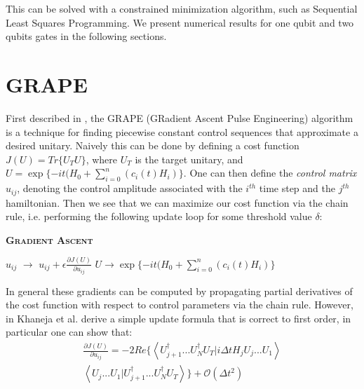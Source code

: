 \documentclass[aps,nofootinbib,pra,notitlepage,twocolumn]{revtex4-1}
\newcommand{\braket}[2]{\left\langle #1 | #2 \right\rangle}
\begin{document}
This can be solved with a constrained minimization algorithm, such as Sequential Least Squares Programming. We present numerical results for one qubit and two qubits gates in the following sections.

\section{GRAPE}
First described in \cite{Khaneja2005}, the GRAPE (GRadient Ascent Pulse Engineering) algorithm is a technique for finding piecewise constant control sequences that approximate a desired unitary. Naively this can be done by defining a cost function $J(U) = Tr\{U_TU\}$, where $U_T$ is the target unitary, and $U = \exp\{-it(H_0 + \sum_{i=0}^{n}(c_i(t)H_i)\}$. One can then define the \textit{control matrix} $u_{ij}$, denoting the control amplitude associated with the $i^{th}$ time step and the $j^{th}$ hamiltonian. Then we see that we can maximize our cost function via the chain rule, i.e. performing the following update loop for some threshold value $\delta$:

\begin{algorithm}[H]
  \caption*{\textsc{\textbf{Gradient Ascent}}}
   \begin{algorithmic}
\State $u_{ij}$ $\rightarrow$ $u_{ij} + \epsilon\frac{\partial J(U)}{\partial u_{ij}}$
\State $U \rightarrow \exp\{-it(H_0 + \sum_{i=0}^{n}(c_i(t)H_i)\}$
\EndWhile

   \end{algorithmic}
\end{algorithm}


In general these gradients can be computed by propagating partial derivatives of the cost function with respect to control parameters via the chain rule. However, in \cite{Khaneja2005} Khaneja et al. derive a simple update formula that is correct to first order, in particular one can show that:
\begin{align}
\frac{\partial J(U)}{\partial u_{ij}} = -2Re\{\braket{{U_{j+1}^{\dagger}...U_N^{\dagger} U_T}}{i\Delta tH_jU_j...U_1}\\
\braket{U_j...U_1}{U_{j+1}^{\dagger}...U_N^{\dagger} U_T}\} +  \mathcal{O}(\Delta t^2)
\end{align}
\end{document}
